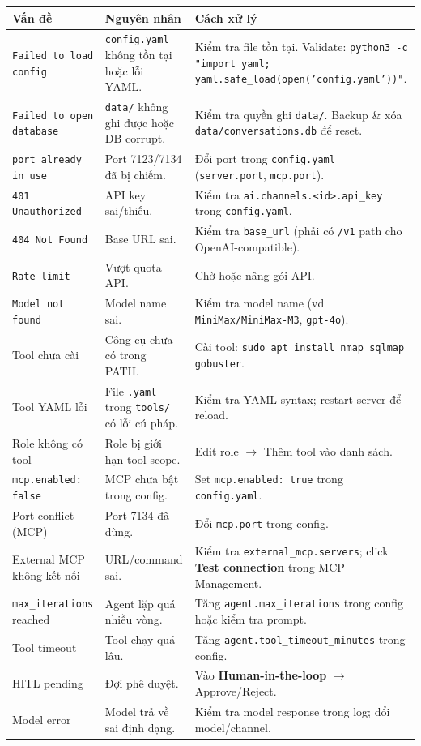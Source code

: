 \documentclass[11pt,a4paper]{article}
\newcommand{\ccode}[1]{\texttt{\small #1}}
\begin{document}
\begin{longtable}{L{3.6cm}L{4.6cm}p{7.3cm}}
  \toprule
  \textbf{Vấn đề} & \textbf{Nguyên nhân} & \textbf{Cách xử lý} \\
  \midrule
  \endhead
  \ccode{Failed to load config} & \ccode{config.yaml} không tồn tại hoặc lỗi YAML. & Kiểm tra file tồn tại. Validate: \ccode{python3 -c "import yaml; yaml.safe\_load(open('config.yaml'))"}. \\
  \ccode{Failed to open database} & \ccode{data/} không ghi được hoặc DB corrupt. & Kiểm tra quyền ghi \ccode{data/}. Backup \& xóa \ccode{data/conversations.db} để reset. \\
  \ccode{port already in use} & Port 7123/7134 đã bị chiếm. & Đổi port trong \ccode{config.yaml} (\ccode{server.port}, \ccode{mcp.port}). \\
  \ccode{401 Unauthorized} & API key sai/thiếu. & Kiểm tra \ccode{ai.channels.<id>.api\_key} trong \ccode{config.yaml}. \\
  \ccode{404 Not Found} & Base URL sai. & Kiểm tra \ccode{base\_url} (phải có \ccode{/v1} path cho OpenAI-compatible). \\
  \ccode{Rate limit} & Vượt quota API. & Chờ hoặc nâng gói API. \\
  \ccode{Model not found} & Model name sai. & Kiểm tra model name (vd \ccode{MiniMax/MiniMax-M3}, \ccode{gpt-4o}). \\
  Tool chưa cài & Công cụ chưa có trong PATH. & Cài tool: \ccode{sudo apt install nmap sqlmap gobuster}. \\
  Tool YAML lỗi & File \ccode{.yaml} trong \ccode{tools/} có lỗi cú pháp. & Kiểm tra YAML syntax; restart server để reload. \\
  Role không có tool & Role bị giới hạn tool scope. & Edit role $\rightarrow$ Thêm tool vào danh sách. \\
  \ccode{mcp.enabled: false} & MCP chưa bật trong config. & Set \ccode{mcp.enabled: true} trong \ccode{config.yaml}. \\
  Port conflict (MCP) & Port 7134 đã dùng. & Đổi \ccode{mcp.port} trong config. \\
  External MCP không kết nối & URL/command sai. & Kiểm tra \ccode{external\_mcp.servers}; click \textbf{Test connection} trong MCP Management. \\
  \ccode{max\_iterations} reached & Agent lặp quá nhiều vòng. & Tăng \ccode{agent.max\_iterations} trong config hoặc kiểm tra prompt. \\
  Tool timeout & Tool chạy quá lâu. & Tăng \ccode{agent.tool\_timeout\_minutes} trong config. \\
  HITL pending & Đợi phê duyệt. & Vào \textbf{Human-in-the-loop} $\rightarrow$ Approve/Reject. \\
  Model error & Model trả về sai định dạng. & Kiểm tra model response trong log; đổi model/channel. \\
  \bottomrule
\end{longtable}
\end{document}
